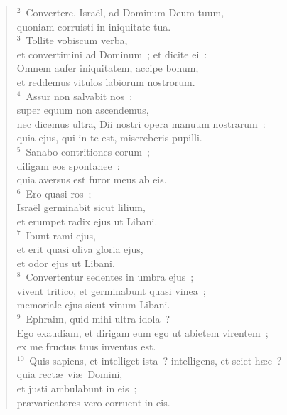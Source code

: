 \begin{flushleft}\begin{verse}\vspace{6pt}${}^{2}$~Convertere, Isra\"el, ad Dominum Deum tuum,\\ quoniam corruisti in iniquitate tua.\\
${}^{3}$~Tollite vobiscum verba,\\ et convertimini ad Dominum~; et dicite ei~:\\ Omnem aufer iniquitatem, accipe bonum,\\ et reddemus vitulos labiorum nostrorum.\\
${}^{4}$~Assur non salvabit nos~:\\ super equum non ascendemus,\\ nec dicemus ultra, Dii nostri opera manuum nostrarum~:\\ quia ejus, qui in te est, misereberis pupilli.\\
${}^{5}$~Sanabo contritiones eorum~;\\ diligam eos spontanee~:\\ quia aversus est furor meus ab eis.\\
${}^{6}$~Ero quasi ros~;\\ Isra\"el germinabit sicut lilium,\\ et erumpet radix ejus ut Libani.\\
${}^{7}$~Ibunt rami ejus,\\ et erit quasi oliva gloria ejus,\\ et odor ejus ut Libani.\\
${}^{8}$~Convertentur sedentes in umbra ejus~;\\ vivent tritico, et germinabunt quasi vinea~;\\ memoriale ejus sicut vinum Libani.\\
${}^{9}$~Ephraim, quid mihi ultra idola~?\\ Ego exaudiam, et dirigam eum ego ut abietem virentem~;\\ ex me fructus tuus inventus est.\\
${}^{10}$~Quis sapiens, et intelliget ista~? intelligens, et sciet h\ae c~?\\ quia rect\ae\ vi\ae\ Domini,\\ et justi ambulabunt in eis~;\\ pr\ae varicatores vero corruent in eis.\end{verse}\end{flushleft}


